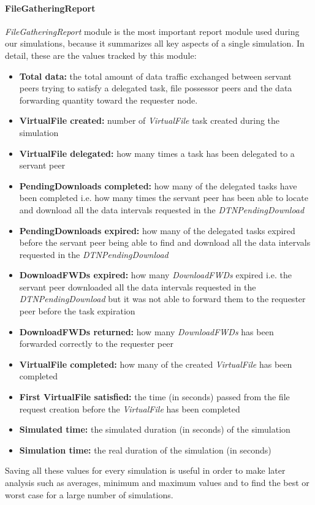 \paragraph{FileGatheringReport}
\textit{FileGatheringReport} module is the most important report module used during our simulations, because it summarizes all key aspects of a single simulation. In detail, these are the values tracked by this module:
\begin{itemize}
\item \textbf{Total data:}	the total amount of data traffic exchanged between servant peers trying to satisfy a delegated task, file possessor peers and the data forwarding quantity toward the requester node.
\item \textbf{VirtualFile created:}	number of \textit{VirtualFile} task created during the simulation
\item \textbf{VirtualFile delegated:} how many times a task has been delegated to a servant peer
\item \textbf{PendingDownloads completed:} how many of the delegated tasks have been completed i.e. how many times the servant peer has been able to locate and download all the data intervals requested in the \textit{DTNPendingDownload} 
\item \textbf{PendingDownloads expired:} how many of the delegated tasks expired before the servant peer being able to find and download all the data intervals requested in the \textit{DTNPendingDownload} 
\item \textbf{DownloadFWDs expired:} how many \textit{DownloadFWDs} expired i.e. the servant peer downloaded all the data intervals requested in the \textit{DTNPendingDownload} but it was not able to forward them to the requester peer before the task expiration
\item \textbf{DownloadFWDs returned:} how many \textit{DownloadFWDs} has been forwarded correctly to the requester peer
\item \textbf{VirtualFile completed:} how many of the created \textit{VirtualFile} has been completed
\item \textbf{First VirtualFile satisfied:}	the time (in seconds) passed from the file request creation before the \textit{VirtualFile} has been completed
\item \textbf{Simulated time:} the simulated duration (in seconds) of the simulation
\item \textbf{Simulation time:}	the real duration of the simulation (in seconds)
\end{itemize}
Saving all these values for every simulation is useful in order to make later analysis such as averages, minimum and maximum values and to find the best or worst case for a large number of simulations.

